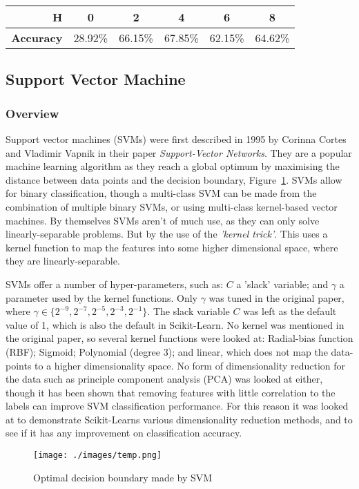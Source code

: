 \documentclass[12pt,a4paper,titlepage,twoside]{report}
\begin{document}
	\begin{tabular}{r c c c c c}
	\hline
	\textbf{H}	& 0 & 2 & 4 & 6 & 8 \\ \hline
	\textbf{Accuracy} & 28.92\% & 66.15\% & 67.85\% & 62.15\% & 64.62\%  \\ \hline
	\end{tabular}

\subsection{Support Vector Machine}

\subsubsection*{Overview}
	Support vector machines (SVMs) were first described in 1995 by Corinna Cortes and Vladimir Vapnik in their paper \textit{Support-Vector Networks}\cite{support-vector-machines}. They are a popular machine learning algorithm as they reach a global optimum by maximising the distance between data points and the decision boundary, Figure~\ref{fig:svm-opt-bound}. SVMs allow for binary classification, though a multi-class SVM can be made from the combination of multiple binary SVMs, or using multi-class kernel-based vector machines\cite{multiclass-svm}. By themselves SVMs aren't of much use, as they can only solve linearly-separable problems. But by the use of the \textit{'kernel trick'}\cite{ml-algorithmic-perspective}. This uses  a kernel function to map the features into some higher dimensional space, where they are linearly-separable. \par
	SVMs offer a number of hyper-parameters, such as: \textbf{$C$} a 'slack' variable; and $\gamma$ a parameter used by the kernel functions. Only $\gamma$ was tuned in the original paper, where $\gamma \in \{2^{-9}, 2^{-7}, 2^{-5}, 2^{-3}, 2^{-1}\}$. The slack variable $C$ was left as the default value of 1, which is also the default in Scikit-Learn. No kernel was mentioned in the original paper, so several kernel functions were looked at: Radial-bias function (RBF); Sigmoid; Polynomial (degree 3); and linear, which does not map the data-points to a higher dimensionality space. No form of dimensionality reduction for the data such as principle component analysis (PCA) was looked at either, though it has been shown that removing features with little correlation to the labels can improve SVM classification performance\cite{svm-reduce-dim}. For this reason it was looked at to demonstrate Scikit-Learns various dimensionality reduction methods, and to see if it has any improvement on classification accuracy.
	\begin{figure}[h]
		\centering
  		\texttt{[image: ./images/temp.png]}
  		\caption{Optimal decision boundary made by SVM}
  		\label{fig:svm-opt-bound}
	\end{figure}
	
\end{document}
